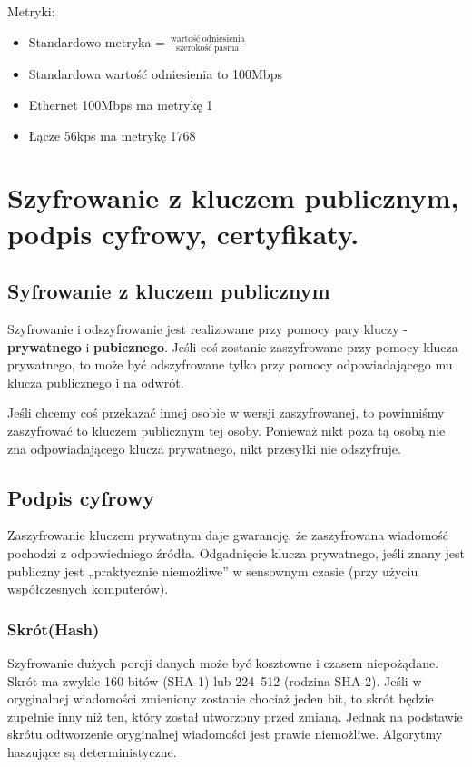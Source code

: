 \documentclass[main.tex]{subfiles}
\begin{document}
    Metryki:
    \begin{itemize}
        \item Standardowo metryka = $\frac{\mathrm{wartość\ odniesienia}}{\mathrm{szerokość\ pasma}}$
        \item Standardowa wartość odniesienia to 100Mbps
        \item Ethernet 100Mbps ma metrykę 1
        \item Łącze 56kps ma metrykę 1768
    \end{itemize}

    \newpage

    \section{Szyfrowanie z kluczem publicznym, podpis cyfrowy, certyfikaty.}
    \subsection{Syfrowanie z kluczem publicznym}
    Szyfrowanie i odszyfrowanie jest realizowane przy pomocy pary kluczy - \textbf{prywatnego} i \textbf{pubicznego}.
    Jeśli coś zostanie zaszyfrowane przy pomocy klucza prywatnego, to może być odszyfrowane tylko przy pomocy odpowiadającego mu klucza publicznego i na odwrót.

    Jeśli chcemy coś przekazać innej osobie w wersji zaszyfrowanej, to powinniśmy zaszyfrować to kluczem publicznym tej osoby. Ponieważ nikt poza tą osobą nie
    zna odpowiadającego klucza prywatnego, nikt przesyłki nie odszyfruje.

    \subsection{Podpis cyfrowy}

    Zaszyfrowanie kluczem prywatnym daje gwarancję, że zaszyfrowana wiadomość pochodzi z odpowiedniego źródła.
    Odgadnięcie klucza prywatnego, jeśli znany jest publiczny jest „praktycznie niemożliwe” w sensownym czasie (przy użyciu współczesnych komputerów).


    \subsubsection{Skrót(Hash)}
    Szyfrowanie dużych porcji danych może być kosztowne i czasem niepożądane. Skrót ma zwykle 160 bitów (SHA-1) lub 224--512 (rodzina SHA-2).
    Jeśli w oryginalnej wiadomości zmieniony zostanie chociaż jeden bit, to skrót będzie zupełnie inny niż ten, który został
    utworzony przed zmianą. Jednak na podstawie skrótu odtworzenie oryginalnej wiadomości jest prawie niemożliwe. Algorytmy haszujące są deterministyczne.
\end{document}
